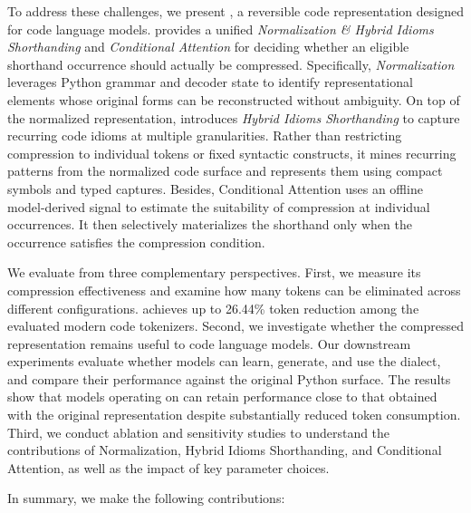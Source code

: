 To address these challenges, we present \tool, a reversible code representation designed for code language models. \tool provides a unified \textit{Normalization \& Hybrid Idioms Shorthanding} and \textit{Conditional Attention} for deciding whether an eligible shorthand occurrence should actually be compressed. Specifically, \textit{Normalization} leverages Python grammar and decoder state to identify representational elements whose original forms can be reconstructed without ambiguity. On top of the normalized representation, \tool introduces \textit{Hybrid Idioms Shorthanding} to capture recurring code idioms at multiple granularities. Rather than restricting compression to individual tokens or fixed syntactic constructs, it mines recurring patterns from the normalized code surface and represents them using compact symbols and typed captures. Besides, Conditional Attention uses an offline model-derived signal to estimate the suitability of compression at individual occurrences. It then selectively materializes the shorthand only when the occurrence satisfies the compression condition.


We evaluate \tool from three complementary perspectives. First, we measure its compression effectiveness and examine how many tokens can be eliminated across different configurations. \tool achieves up to 26.44\% token reduction among the evaluated modern code tokenizers. Second, we investigate whether the compressed representation remains useful to code language models. Our downstream experiments evaluate whether models can learn, generate, and use the \tool dialect, and compare their performance against the original Python surface. The results show that models operating on \tool can retain performance close to that obtained with the original representation despite substantially reduced token consumption. Third, we conduct ablation and sensitivity studies to understand the contributions of Normalization, Hybrid Idioms Shorthanding, and Conditional Attention, as well as the impact of key parameter choices.


In summary, we make the following contributions:



